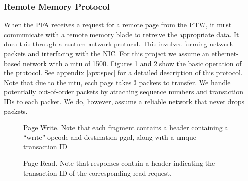 \subsubsection{Remote Memory Protocol}
When the PFA receives a request for a remote page from the PTW, it must
communicate with a remote \gls{memory blade} to retreive the appropriate data. It
does this through a custom network protocol. This involves forming network
packets and interfacing with the NIC. For this project we assume an
ethernet-based network with a \gls{mtu} of \SI{1500}{\byte}.
Figures \ref{fig:write_protocol} and \ref{fig:read_protocol} show the basic
operation of the protocol. See appendix \ref{apx:spec} for a detailed
description of this protocol. Note that due to the \gls{mtu}, each page takes 3
packets to transfer. We handle potentially out-of-order packets by attaching
sequence numbers and transaction IDs to each packet. We do, however, assume a
reliable network that never drops packets.

\begin{figure}[h]
    \centering
    \begin{sequencediagram}
    \end{sequencediagram}
    \caption{Page Write. Note that each fragment contains a header containing a
    ``write'' opcode and destination \gls{pgid}, along with a unique
    transaction ID.}
		\label{fig:write_protocol}
\end{figure} 
 
\begin{figure}[h]
    \centering
    \begin{sequencediagram}
    \end{sequencediagram}
		\caption{Page Read. Note that responses contain a header indicating the
    transaction ID of the corresponding read request.}
		\label{fig:read_protocol}
\end{figure} 

